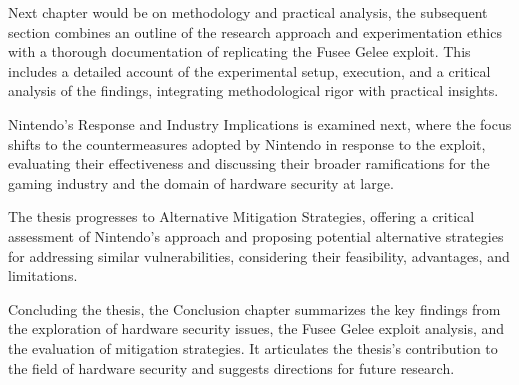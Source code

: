 Next chapter would be on methodology and practical analysis, the
subsequent section combines an outline of the research approach and
experimentation ethics with a thorough documentation of replicating the
Fusee Gelee exploit. This includes a detailed account of the
experimental setup, execution, and a critical analysis of the findings,
integrating methodological rigor with practical insights.

Nintendo's Response and Industry Implications is examined next, where
the focus shifts to the countermeasures adopted by Nintendo in response
to the exploit, evaluating their effectiveness and discussing their
broader ramifications for the gaming industry and the domain of hardware
security at large.

The thesis progresses to Alternative Mitigation Strategies, offering a
critical assessment of Nintendo's approach and proposing potential
alternative strategies for addressing similar vulnerabilities,
considering their feasibility, advantages, and limitations.

Concluding the thesis, the Conclusion chapter summarizes the key
findings from the exploration of hardware security issues, the Fusee
Gelee exploit analysis, and the evaluation of mitigation strategies. It
articulates the thesis's contribution to the field of hardware security
and suggests directions for future research.
